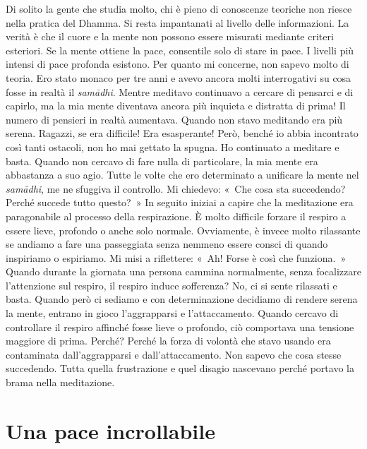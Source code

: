 Di solito la gente che studia molto, chi è pieno di conoscenze teoriche
non riesce nella pratica del Dhamma. Si resta impantanati al livello
delle informazioni. La verità è che il cuore e la mente non possono
essere misurati mediante criteri esteriori. Se la mente ottiene la pace,
consentile solo di stare in pace. I livelli più intensi di pace profonda
esistono. Per quanto mi concerne, non sapevo molto di teoria. Ero stato
monaco per tre anni e avevo ancora molti interrogativi su cosa fosse in
realtà il \emph{samādhi}. Mentre meditavo continuavo a cercare di
pensarci e di capirlo, ma la mia mente diventava ancora più inquieta e
distratta di prima! Il numero di pensieri in realtà aumentava. Quando
non stavo meditando era più serena. Ragazzi, se era difficile! Era
esasperante! Però, benché io abbia incontrato così tanti ostacoli, non
ho mai gettato la spugna. Ho continuato a meditare e basta. Quando non
cercavo di fare nulla di particolare, la mia mente era abbastanza a suo
agio. Tutte le volte che ero determinato a unificare la mente nel
\emph{samādhi}, me ne sfuggiva il controllo. Mi chiedevo: «~Che cosa sta
succedendo? Perché succede tutto questo?~» In seguito iniziai a capire
che la meditazione era paragonabile al processo della respirazione. È
molto difficile forzare il respiro a essere lieve, profondo o anche solo
normale. Ovviamente, è invece molto rilassante se andiamo a fare una
passeggiata senza nemmeno essere consci di quando inspiriamo o
espiriamo. Mi misi a riflettere: «~Ah! Forse è così che funziona.~»
Quando durante la giornata una persona cammina normalmente, senza
focalizzare l'attenzione sul respiro, il respiro induce sofferenza? No,
ci si sente rilassati e basta. Quando però ci sediamo e con
determinazione decidiamo di rendere serena la mente, entrano in gioco
l'aggrapparsi e l'attaccamento. Quando cercavo di controllare il respiro
affinché fosse lieve o profondo, ciò comportava una tensione maggiore di
prima. Perché? Perché la forza di volontà che stavo usando era
contaminata dall'aggrapparsi e dall'attaccamento. Non sapevo che cosa
stesse succedendo. Tutta quella frustrazione e quel disagio nascevano
perché portavo la brama nella meditazione.

\section{Una pace incrollabile}

